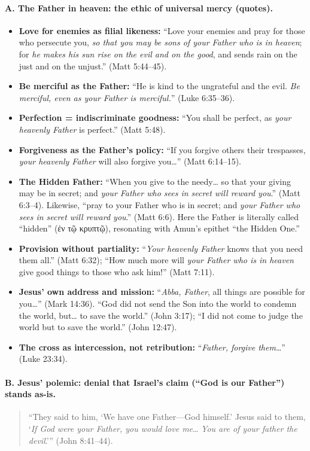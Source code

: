 \paragraph{A. The Father in heaven: the ethic of universal mercy (quotes).}
\begin{itemize}
    \item \textbf{Love for enemies as filial likeness:} “Love your enemies and pray for those who persecute you, \emph{so that you may be sons of your Father who is in heaven}; for \emph{he makes his sun rise on the evil and on the good}, and sends rain on the just and on the unjust.” (Matt 5:44–45).
    \item \textbf{Be merciful as the Father:} “He is kind to the ungrateful and the evil. \emph{Be merciful, even as your Father is merciful.}” (Luke 6:35–36).
    \item \textbf{Perfection = indiscriminate goodness:} “You shall be perfect, as \emph{your heavenly Father} is perfect.” (Matt 5:48).
    \item \textbf{Forgiveness as the Father’s policy:} “If you forgive others their trespasses, \emph{your heavenly Father} will also forgive you…” (Matt 6:14–15).
    \item \textbf{The Hidden Father:} “When you give to the needy… so that your giving may be in secret; and \emph{your Father who sees in secret will reward you}.” (Matt 6:3–4). Likewise, “pray to your Father who is in secret; and \emph{your Father who sees in secret will reward you}.” (Matt 6:6). Here the Father is literally called “hidden” (ἐν τῷ κρυπτῷ), resonating with Amun’s epithet “the Hidden One.”
    \item \textbf{Provision without partiality:} “\emph{Your heavenly Father} knows that you need them all.” (Matt 6:32); “How much more will \emph{your Father who is in heaven} give good things to those who ask him!” (Matt 7:11).
    \item \textbf{Jesus’ own address and mission:} “\emph{Abba, Father}, all things are possible for you…” (Mark 14:36). “God did not send the Son into the world to condemn the world, but… to save the world.” (John 3:17); “I did not come to judge the world but to save the world.” (John 12:47).
    \item \textbf{The cross as intercession, not retribution:} “\emph{Father, forgive them}…” (Luke 23:34).
\end{itemize}

\paragraph{B. Jesus’ polemic: denial that Israel’s claim (“God is our Father”) stands as-is.}
\begin{quote}
    “They said to him, ‘We have one Father—God himself.’ Jesus said to them, ‘\emph{If God were your Father, you would love me}… \emph{You are of your father the devil}.’” (John 8:41–44).
\end{quote}

